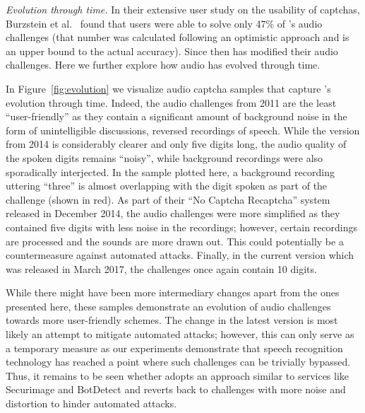 \emph{Evolution through time.} In their extensive user study on the usability of captchas, Burzstein et al.~\cite{captchas-are-hard}
found that users were able to solve only 47\% of \re's audio challenges (that number was calculated following an optimistic approach
and is an upper bound to the actual accuracy). Since then \re has modified their audio challenges. %
Here we further explore how audio \re has evolved through time. 

In Figure~\ref{fig:evolution} we visualize audio captcha samples
that capture \re's evolution through time. Indeed, the audio challenges from 2011 are the least ``user-friendly'' as they contain
a significant amount of background noise in the form of unintelligible discussions, reversed recordings of speech. While the version
from 2014 is considerably clearer and only five digits long, the audio quality of the spoken digits remains ``noisy'', while background recordings were
also sporadically interjected. In the sample plotted here, a background recording uttering ``three'' is almost overlapping with the
digit spoken as part of the challenge (shown in red). As part of their ``No Captcha Recaptcha'' system released in December 2014, the audio challenges were 
more simplified as they contained five digits with less noise in the recordings; however, certain recordings are processed and the sounds
are more drawn out. This could potentially be a countermeasure against automated attacks. 
Finally, in the current version which was released in March 2017,
the challenges once again contain 10 digits. 

While there might have been more intermediary changes apart from the ones presented here,
these samples demonstrate an evolution of audio \re challenges towards more user-friendly schemes. The change in the latest version 
is most likely an attempt to mitigate automated attacks; however, this can only serve as a temporary measure as our experiments
demonstrate that speech recognition technology has reached a point where such challenges can be trivially bypassed. Thus, it remains 
to be seen whether \re adopts an approach similar to services like Securimage and BotDetect and reverts back to challenges with 
more noise and distortion to hinder automated attacks.

